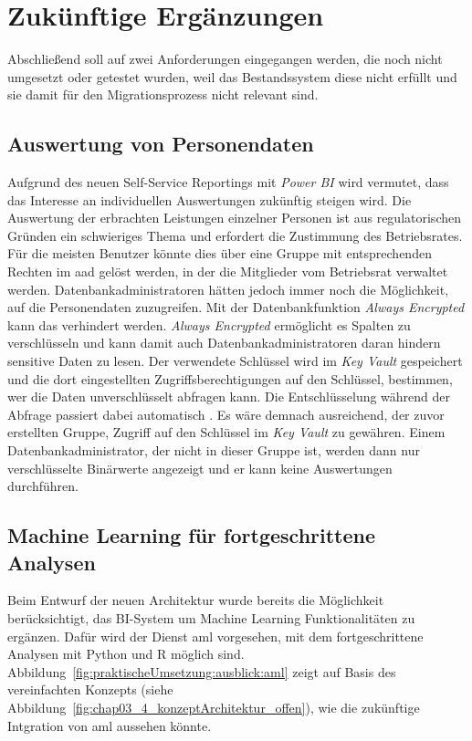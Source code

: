 \section{Zukünftige Ergänzungen} \label{sec:praktischeUmsetzung:ausblick}
Abschließend soll auf zwei Anforderungen eingegangen werden, die noch nicht umgesetzt oder getestet wurden, weil das Bestandssystem diese nicht erfüllt und sie damit für den Migrationsprozess nicht relevant sind.

\subsection{Auswertung von Personendaten}
Aufgrund des neuen Self-Service Reportings mit \textit{Power BI} wird vermutet, dass das Interesse an individuellen Auswertungen zukünftig steigen wird. Die Auswertung der erbrachten Leistungen einzelner Personen ist aus regulatorischen Gründen ein schwieriges Thema und erfordert die Zustimmung des Betriebsrates. Für die meisten Benutzer könnte dies über eine Gruppe mit entsprechenden Rechten im \ac{aad} gelöst werden, in der die Mitglieder vom Betriebsrat verwaltet werden. Datenbankadministratoren hätten jedoch immer noch die Möglichkeit, auf die Personendaten zuzugreifen. Mit der Datenbankfunktion \textit{Always Encrypted} kann das verhindert werden. \textit{Always Encrypted} ermöglicht es Spalten zu verschlüsseln und kann damit auch Datenbankadministratoren daran hindern sensitive Daten zu lesen. Der verwendete Schlüssel wird im \textit{Key Vault} gespeichert und die dort eingestellten Zugriffsberechtigungen auf den Schlüssel, bestimmen, wer die Daten unverschlüsselt abfragen kann. Die Entschlüsselung während der Abfrage passiert dabei automatisch \cite{mauri_practical_2021}. Es wäre demnach ausreichend, der zuvor erstellten Gruppe, Zugriff auf den Schlüssel im \textit{Key Vault} zu gewähren. Einem Datenbankadministrator, der nicht in dieser Gruppe ist, werden dann nur verschlüsselte Binärwerte angezeigt und er kann keine Auswertungen durchführen.

\subsection{Machine Learning für fortgeschrittene Analysen}
\label{sec:praktischeUmsetzung:ausblick:aml}
Beim Entwurf der neuen Architektur wurde bereits die Möglichkeit berücksichtigt, das BI-System um Machine Learning Funktionalitäten zu ergänzen. Dafür wird der Dienst \ac{aml} vorgesehen, mit dem fortgeschrittene Analysen mit Python und R möglich sind. Abbildung~\ref{fig:praktischeUmsetzung:ausblick:aml} zeigt auf Basis des vereinfachten Konzepts (siehe Abbildung~\ref{fig:chap03_4_konzeptArchitektur_offen}), wie die zukünftige Intgration von \ac{aml} aussehen könnte.


